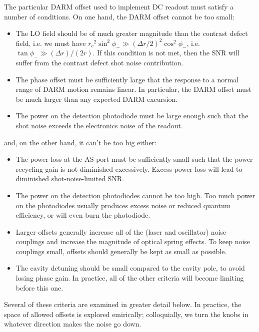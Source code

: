 The particular DARM offset used to implement DC readout must satisfy a
number of conditions.  On one hand, the DARM offset cannot be too small:
\begin{itemize}
\item The LO field should be of much greater magnitude than the contrast
  defect field, i.e. we must have ${r_c}^2\sin^2\phi_- \gg (\Delta
  r/2)^2 \cos^2\phi_-$, i.e. $\tan \phi_- \gg (\Delta r)/(2r)$.  If this condition is not met, then the SNR
  will suffer from the contrast defect shot noise contribution.
\item The phase offset must be sufficiently large that the response to
  a normal range of DARM motion remains linear.  In particular, the
  DARM offset must be much larger than any expected DARM excursion.
\item The power on the detection photodiode must be large enough such
  that the shot noise exceeds the electronics noise of the readout.
\end{itemize}
and, on the other hand, it can't be too big either:
\begin{itemize}
\item The power loss at the AS port must be sufficiently small such
  that the power recycling gain is not diminished excessively.  Excess
  power loss will lead to diminished shot-noise-limited SNR.
\item The power on the detection photodiodes cannot be too high.  Too
  much power on the photodiodes usually produces excess noise or
  reduced quantum efficiency, or will even burn the photodiode.
\item Larger offsets generally increase all of the (laser and
  oscillator) noise couplings and increase the magnitude of optical
  spring effects.  To keep noise couplings small, offsets should
  generally be kept as small as possible.
\item The cavity detuning should be small compared to the cavity pole,
  to avoid losing phase gain.  In practice, all of the other criteria
  will become limiting before this one.
\end{itemize}
Several of these criteria are examined in greater detail below.  In
practice, the space of allowed offsets is explored emirically;
colloquially, we turn the knobs in whatever direction makes the noise
go down.

